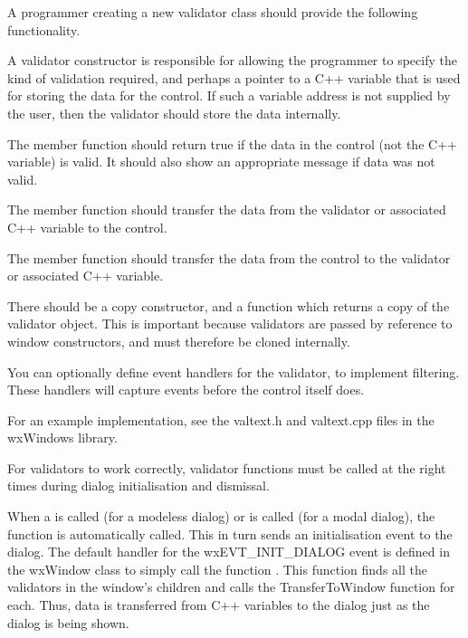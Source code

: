 
A programmer creating a new validator class should provide the following functionality.

A validator constructor is responsible for allowing the programmer to specify the kind
of validation required, and perhaps a pointer to a C++ variable that is used for storing the
data for the control. If such a variable address is not supplied by the user, then
the validator should store the data internally.

The  member function should return
true if the data in the control (not the C++ variable) is valid. It should also show
an appropriate message if data was not valid.

The  member function should
transfer the data from the validator or associated C++ variable to the control.

The  member function should
transfer the data from the control to the validator or associated C++ variable.

There should be a copy constructor, and a  function
which returns a copy of the validator object. This is important because validators
are passed by reference to window constructors, and must therefore be cloned internally.

You can optionally define event handlers for the validator, to implement filtering. These handlers
will capture events before the control itself does.

For an example implementation, see the valtext.h and valtext.cpp files in the wxWindows library.


For validators to work correctly, validator functions must be called at the right times during
dialog initialisation and dismissal.

When a  is called (for a modeless dialog)
or  is called (for a modal dialog),
the function  is automatically called.
This in turn sends an initialisation event to the dialog. The default handler for
the wxEVT\_INIT\_DIALOG event is defined in the wxWindow class to simply call
the function . This
function finds all the validators in the window's children and calls the TransferToWindow
function for each. Thus, data is transferred from C++ variables to the dialog
just as the dialog is being shown.

